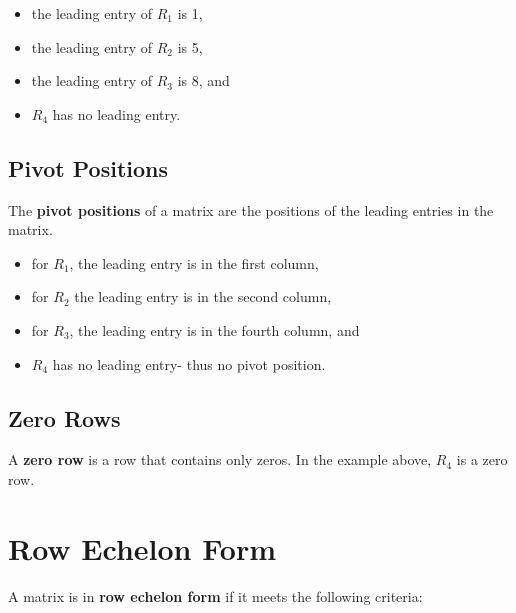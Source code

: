 \documentclass[
  letterpaper,
  DIV=11,
  numbers=noendperiod]{scrreprt}
\providecommand{\tightlist}{%
  \setlength{\itemsep}{0pt}\setlength{\parskip}{0pt}}\usepackage{longtable,booktabs,array}
\begin{document}
\begin{itemize}
\tightlist
\item
  the leading entry of \(R_1\) is 1,
\item
  the leading entry of \(R_2\) is 5,\\
\item
  the leading entry of \(R_3\) is 8, and
\item
  \(R_4\) has no leading entry.
\end{itemize}

\hypertarget{pivot-positions}{%
\subsection*{Pivot Positions}\label{pivot-positions}}

The \textbf{pivot positions} of a matrix are the positions of the
leading entries in the matrix.

\begin{itemize}
\tightlist
\item
  for \(R_1\), the leading entry is in the first column,
\item
  for \(R_2\) the leading entry is in the second column,\\
\item
  for \(R_3\), the leading entry is in the fourth column, and
\item
  \(R_4\) has no leading entry- thus no pivot position.
\end{itemize}

\hypertarget{zero-rows}{%
\subsection*{Zero Rows}\label{zero-rows}}

A \textbf{zero row} is a row that contains only zeros. In the example
above, \(R_4\) is a zero row.

\hypertarget{row-echelon-form}{%
\section*{Row Echelon Form}\label{row-echelon-form}}


A matrix is in \textbf{row echelon form} if it meets the following
criteria:
\end{document}
